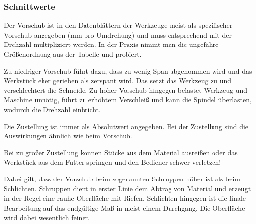 \documentclass{\basedir/fablab-document}
\begin{document}
\subsubsection{Schnittwerte}
\label{Schnittwerte}
Der Vorschub ist in den Datenblättern der Werkzeuge meist als spezifischer Vorschub angegeben (mm pro Umdrehung) und muss entsprechend mit der Drehzahl multipliziert werden.
In der Praxis nimmt man die ungefähre Größenordnung aus der Tabelle und probiert.

Zu niedriger Vorschub führt dazu, dass zu wenig Span abgenommen wird und das Werkstück eher gerieben als zerspant wird.
Das setzt das Werkzeug zu und verschlechtert die Schneide.
Zu hoher Vorschub hingegen belastet Werkzeug und Maschine unnötig,
führt zu erhöhtem Verschleiß und kann die Spindel überlasten, wodurch die Drehzahl einbricht.

Die Zustellung ist immer als Absolutwert angegeben.
Bei der Zustellung sind die Auswirkungen ähnlich wie beim Vorschub.

Bei zu großer Zustellung können Stücke aus dem Material ausreißen oder das Werkstück aus dem Futter
springen und den Bediener schwer verletzen!

Dabei gilt, dass der Vorschub beim sogenannten Schruppen höher ist als beim Schlichten.
Schruppen dient in erster Linie dem Abtrag von Material und erzeugt in der Regel eine rauhe Oberfläche mit Riefen.
Schlichten hingegen ist die finale Bearbeitung auf das endgültige Maß in meist einem Durchgang.
Die Oberfläche wird dabei wesentlich feiner. 
\end{document}
